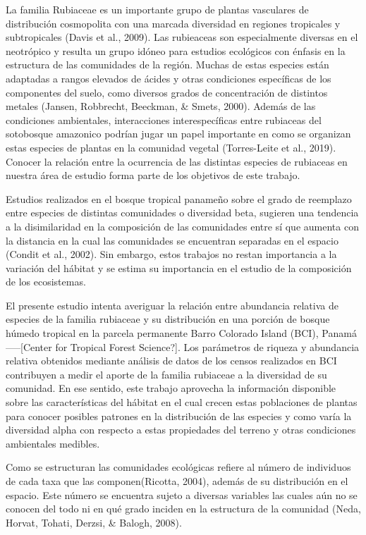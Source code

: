 \documentclass[11pt,]{article}
\begin{document}
La familia Rubiaceae es un importante grupo de plantas vasculares de
distribución cosmopolita con una marcada diversidad en regiones
tropicales y subtropicales (Davis et al., 2009). Las rubieaceas son
especialmente diversas en el neotrópico y resulta un grupo idóneo para
estudios ecológicos con énfasis en la estructura de las comunidades de
la región. Muchas de estas especies están adaptadas a rangos elevados de
ácides y otras condiciones específicas de los componentes del suelo,
como diversos grados de concentración de distintos metales (Jansen,
Robbrecht, Beeckman, \& Smets, 2000). Además de las condiciones
ambientales, interacciones interespecíficas entre rubiaceas del
sotobosque amazonico podrían jugar un papel importante en como se
organizan estas especies de plantas en la comunidad vegetal
(Torres-Leite et al., 2019). Conocer la relación entre la ocurrencia de
las distintas especies de rubiaceas en nuestra área de estudio forma
parte de los objetivos de este trabajo.

Estudios realizados en el bosque tropical panameño sobre el grado de
reemplazo entre especies de distintas comunidades o diversidad beta,
sugieren una tendencia a la disimilaridad en la composición de las
comunidades entre sí que aumenta con la distancia en la cual las
comunidades se encuentran separadas en el espacio (Condit et al., 2002).
Sin embargo, estos trabajos no restan importancia a la variación del
hábitat y se estima su importancia en el estudio de la composición de
los ecosistemas.

El presente estudio intenta averiguar la relación entre abundancia
relativa de especies de la familia rubiaceae y su distribución en una
porción de bosque húmedo tropical en la parcela permanente Barro
Colorado Island (BCI), Panamá-----{[}Center for Tropical Forest
Science?{]}. Los parámetros de riqueza y abundancia relativa obtenidos
mediante análisis de datos de los censos realizados en BCI contribuyen a
medir el aporte de la familia rubiaceae a la diversidad de su comunidad.
En ese sentido, este trabajo aprovecha la información disponible sobre
las características del hábitat en el cual crecen estas poblaciones de
plantas para conocer posibles patrones en la distribución de las
especies y como varía la diversidad alpha con respecto a estas
propiedades del terreno y otras condiciones ambientales medibles.

Como se estructuran las comunidades ecológicas refiere al número de
individuos de cada taxa que las componen(Ricotta, 2004), además de su
distribución en el espacio. Este número se encuentra sujeto a diversas
variables las cuales aún no se conocen del todo ni en qué grado inciden
en la estructura de la comunidad (Neda, Horvat, Tohati, Derzsi, \&
Balogh, 2008).
\end{document}
